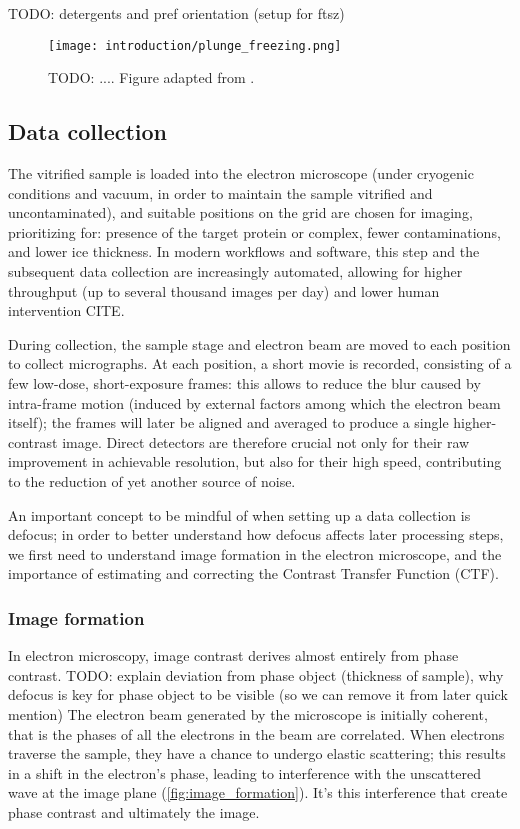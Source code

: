 TODO: detergents and pref orientation (setup for ftsz)

\begin{figure}[ht]
    \centering
    \texttt{[image: introduction/plunge\_freezing.png]}
    \caption[Vitrification via plunge freezing]{TODO: .... Figure adapted from \citet{chungNobelPrizeChemistry2017}.}
    \label{fig:plunge_freezing}
\end{figure}

\subsection{Data collection}
The vitrified sample is loaded into the electron microscope (under cryogenic conditions and vacuum, in order to maintain the sample vitrified and uncontaminated), and suitable positions on the grid are chosen for imaging, prioritizing for: presence of the target protein or complex, fewer contaminations, and lower ice thickness.
In modern workflows and software, this step and the subsequent data collection are increasingly automated, allowing for higher throughput (up to several thousand images per day) and lower human intervention CITE.

During collection, the sample stage and electron beam are moved to each position to collect micrographs.
At each position, a short movie is recorded, consisting of a few low-dose, short-exposure frames: this allows to reduce the blur caused by intra-frame motion (induced by external factors among which the electron beam itself); the frames will later be aligned and averaged to produce a single higher-contrast image.
Direct detectors are therefore crucial not only for their raw improvement in achievable resolution, but also for their high speed, contributing to the reduction of yet another source of noise.

An important concept to be mindful of when setting up a data collection is defocus; in order to better understand how defocus affects later processing steps, we first need to understand image formation in the electron microscope, and the importance of estimating and correcting the Contrast Transfer Function (CTF).

\subsubsection{Image formation}

In electron microscopy, image contrast derives almost entirely from phase contrast.
TODO: explain deviation from phase object (thickness of sample), why defocus is key for phase object to be visible (so we can remove it from later quick mention)
The electron beam generated by the microscope is initially coherent, that is the phases of all the electrons in the beam are correlated.
When electrons traverse the sample, they have a chance to undergo elastic scattering; this results in a shift in the electron's phase, leading to interference with the unscattered wave at the image plane (\autoref{fig:image_formation}).
It's this interference that create phase contrast and ultimately the image.

